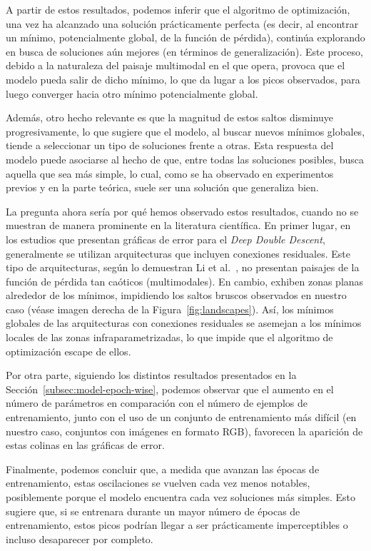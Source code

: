 A partir de estos resultados, podemos inferir que el algoritmo de optimización, una vez ha alcanzado una solución prácticamente perfecta (es decir, al encontrar un mínimo, potencialmente global, de la función de pérdida), continúa explorando en busca de soluciones aún mejores (en términos de generalización). Este proceso, debido a la naturaleza del paisaje multimodal en el que opera, provoca que el modelo pueda salir de dicho mínimo, lo que da lugar a los picos observados, para luego converger hacia otro mínimo potencialmente global.

Además, otro hecho relevante es que la magnitud de estos saltos disminuye progresivamente, lo que sugiere que el modelo, al buscar nuevos mínimos globales, tiende a seleccionar un tipo de soluciones frente a otras. Esta respuesta del modelo puede asociarse al hecho de que, entre todas las soluciones posibles, busca aquella que sea más simple, lo cual, como se ha observado en experimentos previos y en la parte teórica, suele ser una solución que generaliza bien.

La pregunta ahora sería por qué hemos observado estos resultados, cuando no se muestran de manera prominente en la literatura científica. En primer lugar, en los estudios que presentan gráficas de error para el \textit{Deep Double Descent}, generalmente se utilizan arquitecturas que incluyen conexiones residuales. Este tipo de arquitecturas, según lo demuestran Li et al.~\cite{Li2018}, no presentan paisajes de la función de pérdida tan caóticos (multimodales). En cambio, exhiben zonas planas alrededor de los mínimos, impidiendo los saltos bruscos observados en nuestro caso (véase imagen derecha de la Figura~\ref{fig:landscapes}). Así, los mínimos globales de las arquitecturas con conexiones residuales se asemejan a los mínimos locales de las zonas infraparametrizadas, lo que impide que el algoritmo de optimización escape de ellos.

Por otra parte, siguiendo los distintos resultados presentados en la Sección~\ref{subsec:model-epoch-wise}, podemos observar que el aumento en el número de parámetros en comparación con el número de ejemplos de entrenamiento, junto con el uso de un conjunto de entrenamiento más difícil (en nuestro caso, conjuntos con imágenes en formato RGB), favorecen la aparición de estas colinas en las gráficas de error.

Finalmente, podemos concluir que, a medida que avanzan las épocas de entrenamiento, estas oscilaciones se vuelven cada vez menos notables, posiblemente porque el modelo encuentra cada vez soluciones más simples. Esto sugiere que, si se entrenara durante un mayor número de épocas de entrenamiento, estos picos podrían llegar a ser prácticamente imperceptibles o incluso desaparecer por completo.

\endinput
